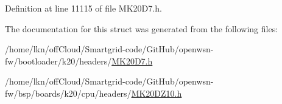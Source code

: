 Definition at line 11115 of file M\+K20\+D7.\+h.



The documentation for this struct was generated from the following files\+:\begin{DoxyCompactItemize}
\item 
/home/lkn/off\+Cloud/\+Smartgrid-\/code/\+Git\+Hub/openwsn-\/fw/bootloader/k20/headers/\hyperlink{bootloader_2k20_2headers_2_m_k20_d7_8h}{M\+K20\+D7.\+h}\item 
/home/lkn/off\+Cloud/\+Smartgrid-\/code/\+Git\+Hub/openwsn-\/fw/bsp/boards/k20/cpu/headers/\hyperlink{_m_k20_d_z10_8h}{M\+K20\+D\+Z10.\+h}\end{DoxyCompactItemize}
